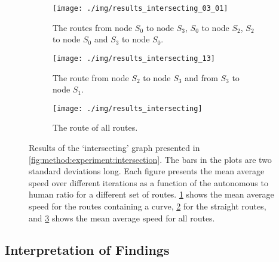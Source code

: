 \begin{figure}
	\centering
	\begin{subfigure}{\textwidth}
		\centering
		\texttt{[image: ./img/results\_intersecting\_03\_01]}
		\caption{The routes from node $S_0$ to node $S_3$, $S_0$ to node $S_2$, $S_2$ to node $S_0$ and $S_3$ to node $S_0$.}
		\label{fig:results:intersecting:03}
	\end{subfigure}
	\begin{subfigure}{\textwidth}
		\centering
		\texttt{[image: ./img/results\_intersecting\_13]}
		\caption{The route from node $S_2$ to node $S_3$ and from $S_3$ to node $S_1$.}
		\label{fig:results:intersecting:13}
	\end{subfigure}	
	\begin{subfigure}{\textwidth}
		\centering
		\texttt{[image: ./img/results\_intersecting]}
		\caption{The route of all routes.}
		\label{fig:results:intersecting:all}
	\end{subfigure}		
	\caption{Results of the `intersecting' graph presented in \cref{fig:method:experiment:intersection}. The bars in the plots are two standard deviations long. Each figure presents the mean average speed over different iterations as a function of the autonomous to human ratio for a different set of routes. \ref{fig:results:intersecting:03} shows the mean average speed for the routes containing a curve, \ref{fig:results:intersecting:13} for the straight routes, and \ref{fig:results:intersecting:all} shows the mean average speed for all routes.}
	\label{fig:results:intersecting}
\end{figure}

\subsection{Interpretation of Findings}
\label{sub:results:interpretation}
